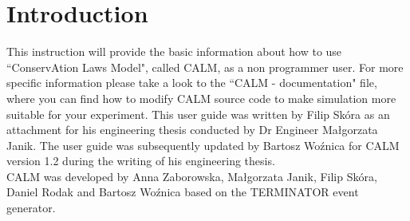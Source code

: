 \newpage
\section{Introduction}
This instruction will provide the basic information about how to use ``ConservAtion Laws Model", called CALM, as a non programmer user. For more specific information please take a look to the ``CALM - documentation" file, where you can find how to modify CALM source code to make simulation more suitable for your experiment.
This user guide was written by Filip Skóra as an attachment for his engineering thesis conducted by Dr Engineer Małgorzata Janik. The user guide was subsequently updated by Bartosz Woźnica for CALM version 1.2 during the writing of his engineering thesis.\\

CALM was developed by Anna Zaborowska, Małgorzata Janik, Filip Skóra, Daniel Rodak and Bartosz Woźnica based on the TERMINATOR \cite{terminator} event generator.